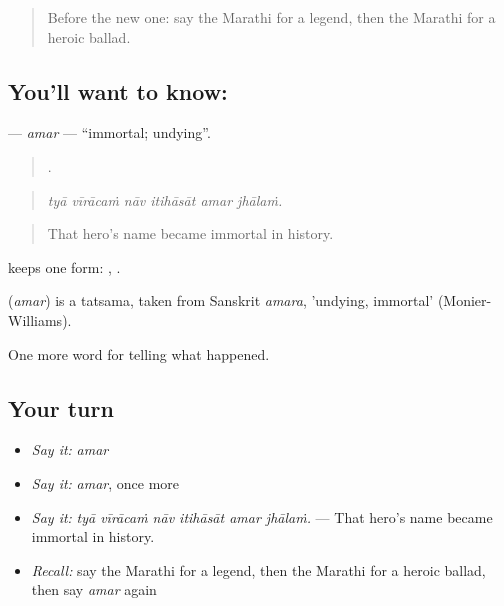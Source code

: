 \label{lesson:MR-C337-amar}



\begin{quote}
Before the new one: say the Marathi for a legend, then the Marathi for a heroic ballad.
\end{quote}

\subsection*{You'll want to know: }
\textbf{} — \emph{amar} — \textquotedblleft{}immortal; undying\textquotedblright{}.

\begin{quote}
     .
\end{quote}

\begin{quote}
\emph{tyā vīrācaṁ nāv itihāsāt amar jhālaṁ.}
\end{quote}

\begin{quote}
That hero's name became immortal in history.
\end{quote}

 keeps one form:  ,  .

\begin{cousinweb}
\textbf{} (\emph{amar}) is a tatsama, taken from Sanskrit \emph{amara}, 'undying, immortal' (Monier-Williams).
\end{cousinweb}

\begin{grammarlens}[title={What you've built}]
One more word for telling what happened.
\end{grammarlens}

\subsection*{Your turn}
\begin{itemize}
\raggedright
  \item \emph{Say it:} \emph{amar}
  \item \emph{Say it:} \emph{amar}, once more
  \item \emph{Say it:} \emph{tyā vīrācaṁ nāv itihāsāt amar jhālaṁ.} — That hero's name became immortal in history.
  \item \emph{Recall:} say the Marathi for a legend, then the Marathi for a heroic ballad, then say \emph{amar} again
\end{itemize}

